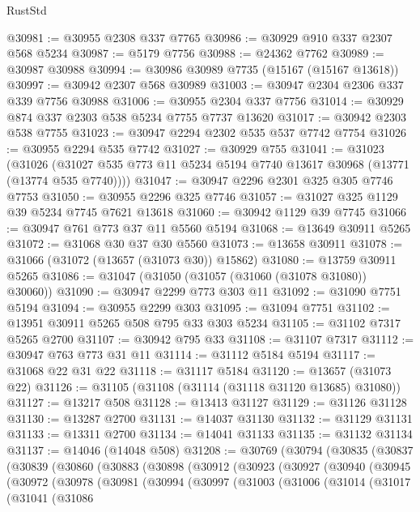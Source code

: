 \begin{lexlean}{RustStd}
\begin{coremodule}
@30981 := @30955 @2308 @337 @7765
@30986 := @30929 @910 @337 @2307 @568 @5234
@30987 := @5179 @7756
@30988 := @24362 @7762
@30989 := @30987 @30988
@30994 := @30986 @30989 @7735 (@15167 (@15167 @13618))
@30997 := @30942 @2307 @568 @30989
@31003 := @30947 @2304 @2306 @337 @339 @7756 @30988
@31006 := @30955 @2304 @337 @7756
@31014 := @30929 @874 @337 @2303 @538 @5234 @7755 @7737 @13620
@31017 := @30942 @2303 @538 @7755
@31023 := @30947 @2294 @2302 @535 @537 @7742 @7754
@31026 := @30955 @2294 @535 @7742
@31027 := @30929 @755
@31041 := @31023
    (@31026 (@31027 @535 @773 @11 @5234 @5194 @7740 @13617 @30968 (@13771 (@13774 @535 @7740))))
@31047 := @30947 @2296 @2301 @325 @305 @7746 @7753
@31050 := @30955 @2296 @325 @7746
@31057 := @31027 @325 @1129 @39 @5234 @7745 @7621 @13618
@31060 := @30942 @1129 @39 @7745
@31066 := @30947 @761 @773 @37 @11 @5560 @5194
@31068 := @13649 @30911 @5265
@31072 := @31068 @30 @37 @30 @5560
@31073 := @13658 @30911
@31078 := @31066 (@31072 (@13657 (@31073 @30)) @15862)
@31080 := @13759 @30911 @5265
@31086 := @31047 (@31050 (@31057 (@31060 (@31078 @31080)) @30060))
@31090 := @30947 @2299 @773 @303 @11
@31092 := @31090 @7751 @5194
@31094 := @30955 @2299 @303
@31095 := @31094 @7751
@31102 := @13951 @30911 @5265 @508 @795 @33 @303 @5234
@31105 := @31102 @7317 @5265 @2700
@31107 := @30942 @795 @33
@31108 := @31107 @7317
@31112 := @30947 @763 @773 @31 @11
@31114 := @31112 @5184 @5194
@31117 := @31068 @22 @31 @22
@31118 := @31117 @5184
@31120 := @13657 (@31073 @22)
@31126 := @31105 (@31108 (@31114 (@31118 @31120 @13685) @31080))
@31127 := @13217 @508
@31128 := @13413 @31127
@31129 := @31126 @31128
@31130 := @13287 @2700
@31131 := @14037 @31130
@31132 := @31129 @31131
@31133 := @13311 @2700
@31134 := @14041 @31133
@31135 := @31132 @31134
@31137 := @14046 (@14048 @508)
@31208 := @30769
    (@30794
      (@30835
        (@30837
          (@30839
            (@30860
              (@30883
                (@30898
                  (@30912
                    (@30923
                      (@30927
                        (@30940
                          (@30945
                            (@30972
                              (@30978
                                (@30981
                                  (@30994
                                    (@30997
                                      (@31003
                                        (@31006
                                          (@31014
                                            (@31017
                                              (@31041
                                                (@31086

\end{coremodule}
\end{lexlean}
